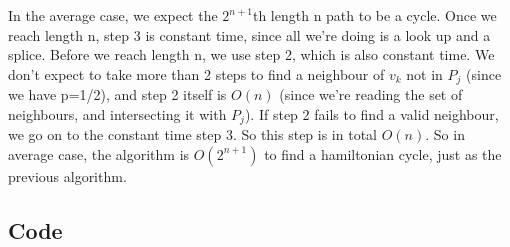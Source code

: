 \documentclass[10pt,a4paper]{report}
\begin{document}
In the average case, we expect the $2^{n+1}$th length n path to be a cycle. Once we reach length n, step 3 is constant time, since all we're doing is a look up and a splice. Before we reach length n, we use step 2, which is also constant time. We don't expect to take more than 2 steps to find a neighbour of $v_k$ not in $P_j$ (since we have p=1/2), and step 2 itself is $O(n)$ (since we're reading the set of neighbours, and intersecting it with $P_j$). If step 2 fails to find a valid neighbour, we go on to the constant time step 3. So this step is in total $O(n)$. So in average case, the algorithm is $O(2^{n+1})$ to find a hamiltonian cycle, just as the previous algorithm.\\

\newpage

\subsection*{Code}
\end{document}
